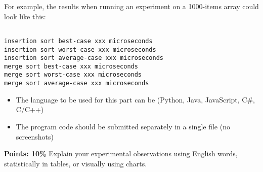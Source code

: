 \documentclass{article}
\begin{document}
For example, the results when running an experiment on a 1000-items array could look like this:

\begin{lstlisting}

insertion sort best-case xxx microseconds
insertion sort worst-case xxx microseconds
insertion sort average-case xxx microseconds
merge sort best-case xxx microseconds
merge sort worst-case xxx microseconds
merge sort average-case xxx microseconds
\end{lstlisting}


\begin{itemize}
    \item The language to be used for this part can be (Python, Java, JavaScript, C\#, C/C++)
    \item The program code should be submitted separately in a single file (no screenshots)
\end{itemize}

\textbf{Points: 10\%} Explain your experimental observations using English words, statistically in tables, or visually using charts.
\end{document}
